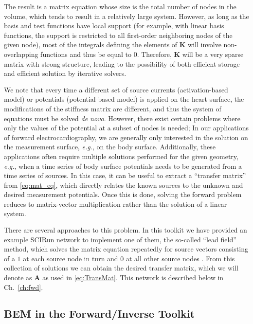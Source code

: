 The result is a matrix equation whose size is the total number of nodes in
the volume, which tends to result in a relatively large system. However, as
long as the basis and test functions have local support (for example, with
linear basis functions, the support is restricted to all first-order
neighboring nodes of the given node), most of the integrals defining the
elements of $\mathbf{K}$ will involve non-overlapping functions and thus be
equal to $0$. Therefore, $\mathbf{K}$ will be a very sparse matrix with
strong structure, leading to the possibility of both efficient storage and
efficient solution by iterative solvers.

We note that every time a different set of source currents
(activation-based model) or potentials (potential-based model) is applied
on the heart surface, the modifications of the stiffness matrix are
different, and thus the system of equations must be solved \textit{de
novo}.
However, there exist certain problems where only the values of the potential at
a subset of nodes is needed; In our applications of forward electrocardiography,
we are generally only interested in the solution on the measurement
surface, \textit{e.g.}, on the body surface. Additionally, these applications often
require multiple solutions performed for the given geometry, \textit{e.g.},
when a time series of body surface potentials needs to be generated
from a time series of sources.
In this case, it can be useful to extract a ``transfer matrix''
from \autoref{eq:mat_eq}, which directly relates the known sources to the
unknown and desired measurement potentials. Once this is done, solving the
forward problem reduces to matrix-vector multiplication rather than the
solution of a linear system.

There are several approaches to this problem. In this toolkit we have
provided an example SCIRun network to implement one of them, the so-called
``lead field'' method, which solves the matrix equation repeatedly for
source vectors consisting of a $1$ at each source node in turn and $0$ at
all other source nodes \cite{JDT:Gul97}. From this collection of solutions we
can obtain the desired transfer matrix, which we will denote as $\mathbf{A}$
as used in \autoref{eq:TransMat}.
This network is described below in Ch.~\ref{ch:fwd}.

\subsection{BEM in the Forward/Inverse Toolkit}

